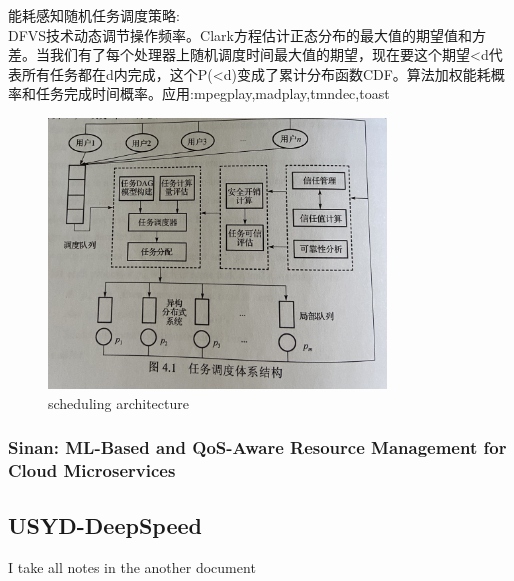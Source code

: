 \documentclass[UTF8]{article}
\begin{document}
    能耗感知随机任务调度策略:\\DFVS技术动态调节操作频率。Clark方程估计正态分布的最大值的期望值和方差。当我们有了每个处理器上随机调度时间最大值的期望，现在要这个期望<d代表所有任务都在d内完成，这个P(<d)变成了累计分布函数CDF。算法加权能耗概率和任务完成时间概率。应用:mpegplay,madplay,tmndec,toast
    
    \begin{figure}[htbp]
    \caption{scheduling architecture}
    \centering
    \includegraphics[width=0.8\textwidth]{xiaoyongSchedule.jpg}
    \end{figure}
    \subsubsection{Sinan: ML-Based and QoS-Aware Resource Management for Cloud Microservices}
    
\subsection{USYD-DeepSpeed}
    I take all notes in the another document



\end{document}
